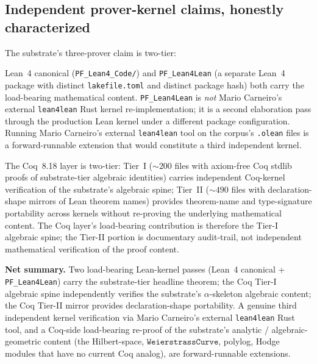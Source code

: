 \documentclass[11pt,a4paper]{amsart}
\theoremstyle{plain}
\theoremstyle{definition}
\begin{document}
\subsection{Independent prover-kernel claims, honestly characterized}\label{subsec:repro-three-prover}

The substrate's three-prover claim is two-tier:

\begin{description}[font=\normalfont\bfseries,leftmargin=2em,itemsep=2pt]
\item[Load-bearing mathematical verification (two provers).] Lean~4 canonical (\texttt{PF\_Lean4\_Code/}) and \texttt{PF\_Lean4Lean} (a separate Lean~4 package with distinct \texttt{lakefile.toml} and distinct package hash) both carry the load-bearing mathematical content. \texttt{PF\_Lean4Lean} is \emph{not} Mario Carneiro's external \texttt{lean4lean} Rust kernel re-implementation; it is a second elaboration pass through the production Lean kernel under a different package configuration. Running Mario Carneiro's external \texttt{lean4lean} tool on the corpus's \texttt{.olean} files is a forward-runnable extension that would constitute a third independent kernel.
\item[Structural audit-trail mirror (Coq).] The Coq~8.18 layer is two-tier: Tier~I ($\sim 200$ files with axiom-free Coq stdlib proofs of substrate-tier algebraic identities) carries independent Coq-kernel verification of the substrate's algebraic spine; Tier~II ($\sim 490$ files with declaration-shape mirrors of Lean theorem names) provides theorem-name and type-signature portability across kernels without re-proving the underlying mathematical content. The Coq layer's load-bearing contribution is therefore the Tier-I algebraic spine; the Tier-II portion is documentary audit-trail, not independent mathematical verification of the proof content.
\end{description}

\textbf{Net summary.} Two load-bearing Lean-kernel passes (Lean~4 canonical + \texttt{PF\_Lean4Lean}) carry the substrate-tier headline theorem; the Coq Tier-I algebraic spine independently verifies the substrate's $\alpha$-skeleton algebraic content; the Coq Tier-II mirror provides declaration-shape portability. A genuine third independent kernel verification via Mario Carneiro's external \texttt{lean4lean} Rust tool, and a Coq-side load-bearing re-proof of the substrate's analytic / algebraic-geometric content (the Hilbert-space, $\texttt{WeierstrassCurve}$, polylog, Hodge modules that have no current Coq analog), are forward-runnable extensions.
\end{document}
